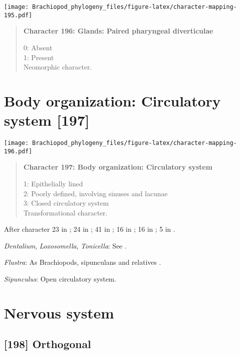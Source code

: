 \documentclass[openany]{book}
\theoremstyle{definition}
\theoremstyle{definition}
\theoremstyle{definition}
\theoremstyle{remark}
\begin{document}
\texttt{[image: Brachiopod\_phylogeny\_files/figure-latex/character-mapping-195.pdf]}

\begin{quote}
\textbf{Character 196: Glands: Paired pharyngeal diverticulae}

0: Absent\\
1: Present\\
Neomorphic character.
\end{quote}

\section{Body organization: Circulatory system
{[}197{]}}\label{body-organization-circulatory-system-197}

\texttt{[image: Brachiopod\_phylogeny\_files/figure-latex/character-mapping-196.pdf]}

\begin{quote}
\textbf{Character 197: Body organization: Circulatory system}

1: Epithelially lined\\
2: Poorly defined, involving sinuses and lacunae\\
3: Closed circulatory system\\
Transformational character.
\end{quote}

After character 23 in \citet{Haszprunar1996}; 24 in
\citet{Haszprunar2000}; 41 in \citet{Rouse1999}; 16 in
\citet{Scheltema1993}; 16 in \citet{Vinther2008}; 5 in
\citet{Haszprunar2008}.

\hypertarget{Dentalium-coding-197}{}
\emph{Dentalium}, \emph{Loxosomella}, \emph{Tonicella}: See
\citet{Haszprunar2008}.

\hypertarget{Flustra-coding-197}{}
\emph{Flustra}: As Brachiopods, sipunculans and relatives
\citep{Ruppert1983}.

\hypertarget{Sipunculus-coding-197}{}
\emph{Sipunculus}: Open circulatory system.

\section{Nervous system}\label{nervous-system}

\subsection*{{[}198{]} Orthogonal}\label{orthogonal}
\end{document}
